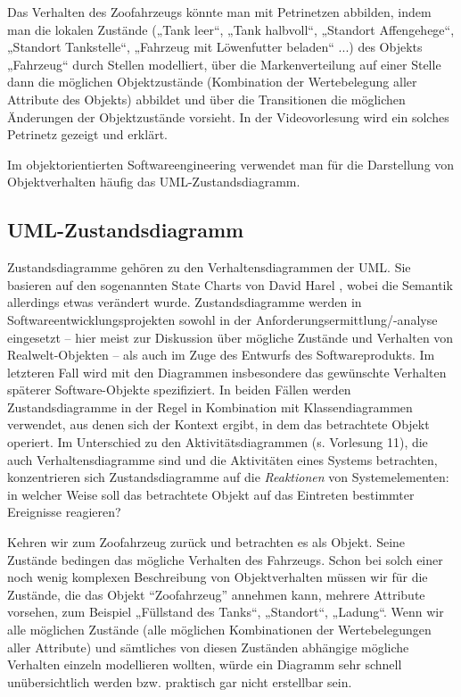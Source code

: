 Das Verhalten des Zoofahrzeugs könnte man mit Petrinetzen abbilden, 
indem man die lokalen Zustände („Tank leer“, „Tank halbvoll“, „Standort Affengehege“, „Standort Tankstelle“, „Fahrzeug mit Löwenfutter beladen“ ...) des Objekts „Fahrzeug“ durch Stellen modelliert, über die Markenverteilung auf einer Stelle dann die möglichen Objektzustände (Kombination der Wertebelegung aller Attribute des Objekts) abbildet und über die Transitionen die möglichen Änderungen der Objektzustände vorsieht. In der Videovorlesung wird ein solches Petrinetz gezeigt und erklärt.

Im objektorientierten Softwareengineering verwendet man für die Darstellung von Objektverhalten häufig das UML-Zustandsdiagramm.

\subsection*{UML-Zustandsdiagramm}

Zustandsdiagramme gehören zu den Verhaltensdiagrammen der UML. Sie basieren auf den sogenannten State Charts von David Harel \cite{har87}, wobei die Semantik allerdings etwas verändert wurde. Zustandsdiagramme werden in Softwareentwicklungsprojekten sowohl in der Anforderungsermittlung/-analyse eingesetzt -- hier meist zur Diskussion über mögliche Zustände und Verhalten von Realwelt-Objekten -- als auch im Zuge des Entwurfs des Softwareprodukts. Im letzteren Fall wird mit den Diagrammen insbesondere das gewünschte Verhalten späterer Software-Objekte spezifiziert. In beiden Fällen werden Zustandsdiagramme in der Regel in Kombination mit Klassendiagrammen verwendet, aus denen sich der Kontext ergibt, in dem das betrachtete Objekt operiert. Im Unterschied zu den Aktivitätsdiagrammen (s. Vorlesung 11), die auch Verhaltensdiagramme sind und die Aktivitäten eines Systems betrachten, konzentrieren sich Zustandsdiagramme auf die \textit{Reaktionen} von Systemelementen: in welcher Weise soll das betrachtete Objekt auf das Eintreten bestimmter Ereignisse reagieren?

Kehren wir zum Zoofahrzeug zurück und betrachten es als Objekt. Seine Zustände bedingen das mögliche Verhalten des Fahrzeugs. Schon bei solch einer noch wenig komplexen Beschreibung von Objektverhalten müssen wir für die Zustände, die das Objekt "`Zoofahrzeug"' annehmen kann, mehrere Attribute vorsehen, zum Beispiel „Füllstand des Tanks“, „Standort“, „Ladung“. Wenn wir alle möglichen Zustände (alle möglichen Kombinationen der Wertebelegungen aller Attribute) und sämtliches von diesen Zuständen abhängige mögliche Verhalten einzeln modellieren wollten, würde ein Diagramm sehr schnell unübersichtlich werden bzw. praktisch gar nicht erstellbar sein. 

